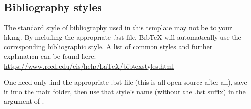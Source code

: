 \subsection{Bibliography styles}

The standard style of bibliography used in this template may not be to your liking. By including the appropriate .bst file, BibTeX will automatically use the corresponding bibliographic style. A list of common styles and further explanation can be found here:  \\
\url{https://www.reed.edu/cis/help/LaTeX/bibtexstyles.html}

One need only find the appropriate .bst file (this is all open-source after all), save it into the main folder, then use that style's name (without the .bst suffix) in the argument of \verb||. 